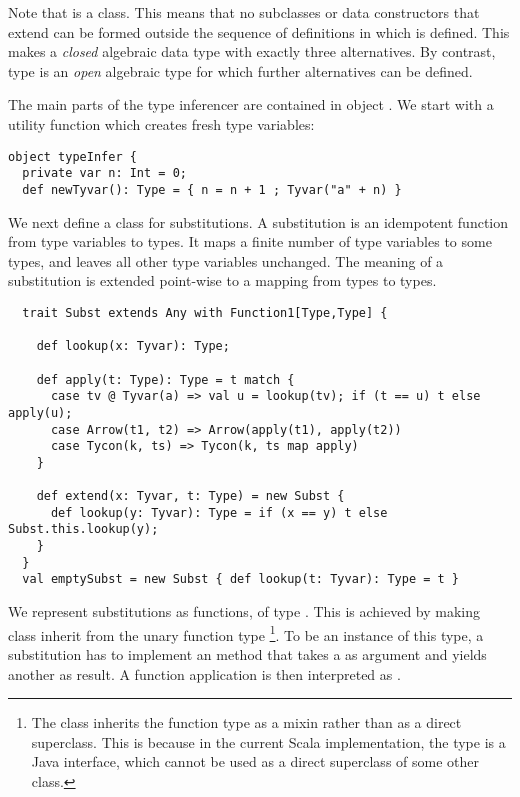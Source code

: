 \documentclass[a4paper,12pt,twoside,titlepage]{book}
\begin{document}
{Note that  is a  class. This means that no
subclasses or data constructors that extend  can be formed
outside the sequence of definitions in which  is defined.
This makes  a {\em closed} algebraic data type with exactly
three alternatives. By contrast, type  is an {\em open}
algebraic type for which further alternatives can be defined.

The main parts of the type inferencer are contained in object
. We start with a utility function which creates
fresh type variables:
\begin{lstlisting}
object typeInfer {
  private var n: Int = 0;
  def newTyvar(): Type = { n = n + 1 ; Tyvar("a" + n) }
\end{lstlisting}
We next define a class for substitutions. A substitution is an
idempotent function from type variables to types. It maps a finite
number of type variables to some types, and leaves all other type
variables unchanged. The meaning of a substitution is extended
point-wise to a mapping from types to types.
\begin{lstlisting}
  trait Subst extends Any with Function1[Type,Type] {

    def lookup(x: Tyvar): Type;

    def apply(t: Type): Type = t match {
      case tv @ Tyvar(a) => val u = lookup(tv); if (t == u) t else apply(u); 
      case Arrow(t1, t2) => Arrow(apply(t1), apply(t2))
      case Tycon(k, ts) => Tycon(k, ts map apply)
    }

    def extend(x: Tyvar, t: Type) = new Subst {
      def lookup(y: Tyvar): Type = if (x == y) t else Subst.this.lookup(y);
    }
  }
  val emptySubst = new Subst { def lookup(t: Tyvar): Type = t }
\end{lstlisting}
We represent substitutions as functions, of type . This is achieved by making class  inherit from the
unary function type \footnote{
The class inherits the function type as a mixin rather than as a direct 
superclass. This is because in the current Scala implementation, the
 type is a Java interface, which cannot be used as a direct
superclass of some other class.}.
To be an instance
of this type, a substitution  has to implement an 
method that takes a  as argument and yields another
 as result. A function application  is then
interpreted as .

}
\end{document}
